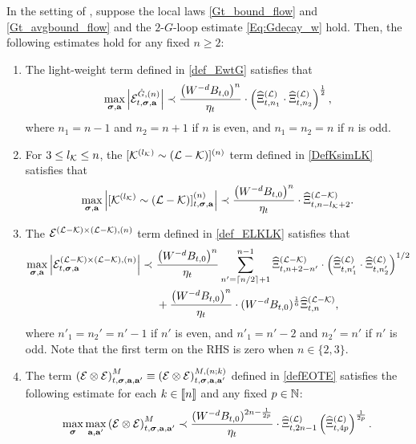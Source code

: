   
\begin{lemma}\label{lem:SEforLn}
In the setting of , suppose the local laws \eqref{Gt_bound_flow} and \eqref{Gt_avgbound_flow} and the $2$-$G$-loop estimate \eqref{Eq:Gdecay_w} hold. Then, the following estimates hold for any fixed $n\ge 2$: 
 \begin{enumerate}

\item The light-weight term defined in \eqref{def_EwtG} satisfies that  
\begin{align}\label{bEwGn}
 \max_{{\boldsymbol{\sigma}},{\mathbf{a}}}\left|{{\mathcal E}^{{\mathring G}, (n)}_{t,{\boldsymbol{\sigma}},{\mathbf{a}}}}\right|\prec \frac{\left({W^{-d}B_{t,0}}\right)^n}{\eta_t} \cdot\left({\widehat\Xi^{({\mathcal L})}_{t, n_1}\cdot \widehat\Xi^{({\mathcal L})}_{t, n_2}}\right)^{\frac12}, 
\end{align} 
where $n_1=n-1$ and $n_2=n+1$ if $n$ is even, and $n_1=n_2=n$ if $n$ is odd.
 
\item For $3\le l_{\mathcal K} \le n$, the $[\mathcal K^{(l_{\mathcal K})}\sim (\mathcal L-\mathcal K)]^{(n)}$ term defined in \eqref{DefKsimLK} satisfies that
\begin{align}\label{eq:KsimL-K}
\max_{{\boldsymbol{\sigma}},{\mathbf{a}}} \left|{[\mathcal K^{(l_{\mathcal K})}\sim (\mathcal L-\mathcal K)]^{(n)}_{t,{\boldsymbol{\sigma}},{\mathbf{a}}}}\right|\prec \frac{\left(W^{-d}B_{t,0}\right)^{n}}{\eta_t}\cdot \widehat\Xi^{({\mathcal L}-{\mathcal K})}_{t, n-l_{\mathcal K}+2}. 
\end{align}


\item The ${\mathcal E}^{(\mathcal L-\mathcal K)\times (\mathcal L-\mathcal K),(n)}$ term defined in \eqref{def_ELKLK} satisfies that 
\begin{align}\label{eq:L-KsimL-K}
\max_{{\boldsymbol{\sigma}},{\mathbf{a}}} \left|{ {\mathcal E}^{(\mathcal L-\mathcal K)\times (\mathcal L-\mathcal K),(n)}_{t,{\boldsymbol{\sigma}},{\mathbf{a}}}}\right|\prec &~ 
  \frac{\left(W^{-d}B_{t,0}\right)^{n}}{\eta_t}  \sum_{n'= \lceil n/2\rceil +1}^{n-1} \widehat\Xi^{({\mathcal L}-{\mathcal K})}_{t,n+2-n'} \cdot \left(\widehat\Xi^{({\mathcal L})}_{t,n_1'} \cdot  \widehat\Xi^{({\mathcal L})}_{t,n_2'}\right)^{1/2} \nonumber\\
 &~ +\frac{\left(W^{-d}B_{t,0}\right)^{n}}{\eta_t}  \cdot (W^{-d} {B}_{t,0})^{\frac 1 6}\widehat\Xi^{({\mathcal L}-{\mathcal K})}_{t,n},
\end{align}
where $n'_1=n_2'=n'-1$ if $n'$ is even, and $n'_1=n'-2$ and $n_2'=n'$ if $n'$ is odd. Note that the first term on the RHS is zero when $n\in\{2,3\}$. 
 
\item The term $\left( \mathcal E\otimes  \mathcal E \right)^{M}_{t, {\boldsymbol{\sigma}}, {\mathbf{a}},{\mathbf{a}}'}\equiv \left( \mathcal E\otimes  \mathcal E \right)^{M,(n;k)}_{t, {\boldsymbol{\sigma}}, {\mathbf{a}},{\mathbf{a}}'}$ defined in \eqref{defEOTE} satisfies the following estimate for each $k \in \llbracket{n}\rrbracket$ and any fixed $p\in \mathbb{N}$:
\begin{align}\label{eq:MG_nloop}
\max_{{\boldsymbol{\sigma}}}\max_{{\mathbf{a}},{\mathbf{a}}'}\left( \mathcal E\otimes  \mathcal E \right)^{M}_{t, {\boldsymbol{\sigma}}, {\mathbf{a}},{\mathbf{a}}'}\prec \frac{(W^{-d} {B}_{t,0})^{2n-\frac{1}{2p}}}{\eta_t}  \cdot \widehat\Xi^{({\mathcal L})}_{t,2n-1}  \left(\widehat\Xi^{({\mathcal L})}_{t,4p}\right)^{\frac{1}{2p}}. 
\end{align}
\end{enumerate}
\end{lemma}
